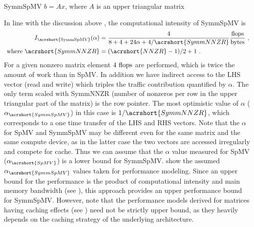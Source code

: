 \begin{algorithm}[t]
	\caption{SymmSpMV $b=Ax$, where $A$ is an upper triangular matrix} 
	\label{alg:SymmSpMV}
	\begin{algorithmic}[1]
			\ENDFOR
		\ENDFOR
	\end{algorithmic}
\end{algorithm}
In line with the discussion above , the computational intensity of \acrshort{SymmSpMV} is
\begin{align}
\label{eq:SymmSpMV_intensity}
I_\mathrm{\acrshort{SymmSpMV}} (\alpha) &= \frac{4}{8+4+24\alpha+4/\acrshort{SymmNNZR}} \frac{\FLOP}{\BYTE}\cma\\
\label{eq:NNZR_symm}
\text{ where  } \acrshort{SymmNNZR} &= (\acrshort{NNZR}-1)/2 + 1\eos
\end{align}
For a given nonzero matrix element $4~\mbox{flops}$ are performed, which is
twice the amount of work than in \acrshort{SpMV}. In addition we have
indirect access to the LHS vector (read and write) which triples the
traffic contribution quantified by $\alpha$\@. The only term scaled
with \acrshort{SymmNNZR} (number of nonzeros per row in the upper
triangular part of the matrix) is the row pointer. The most optimistic
value of $\alpha$ ($\alpha_{\acrshort{SymmSpMV}}$) in this case is
$1/{\acrshort{SymmNNZR}}$, which corresponds to a one time transfer of
the LHS and RHS vectors.  Note that the $\alpha$ for \acrshort{SpMV}
and \acrshort{SymmSpMV} may be different even for the same matrix and
the same compute device, as in the latter case the two vectors are
accessed irregularly and compete for cache. Thus we
can assume that the $\alpha$ value measured for \acrshort{SpMV}
($\alpha_{\acrshort{SpMV}}$) is a lower bound
for \acrshort{SymmSpMV}.  show the 
 assumed $\alpha_{\acrshort{SymmSpMV}}$ values taken for performance
modeling. Since an upper bound for the performance is the
product of computational intensity and main memory bandwidth
(see ), this approach provides an upper
performance bound for \acrshort{SymmSpMV}.  However, note that the
performance models derived for matrices having caching effects
(see ) need not be strictly upper bound, as
they heavily depends on the caching strategy of the underlying
architecture.
\begin{comment}
 for a given matrix structure:
 \begin{align}
\label{eq:SymmSpMV_performance}
P^{max}_\mathrm{\acrshort{SymmSpMV}}  &= I_\mathrm{\acrshort{SymmSpMV}} (\alpha_\mathrm{\acrshort{SpMV}})  \times b_S
\end{align}
As most matrices have a considerable number of nonzeros per row, we chose $b_S$ to be the optimistic (load-only) value  from~\Cref{tab:test_bed}.
\end{comment}

